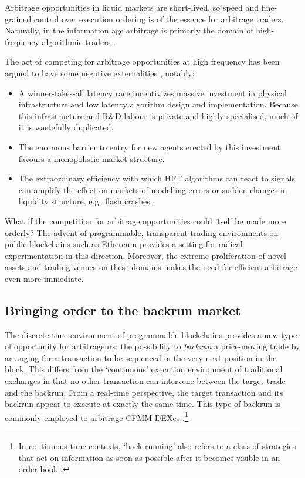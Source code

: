 Arbitrage opportunities in liquid markets are short-lived, so speed and fine-grained control over execution ordering is of the essence for arbitrage traders.
%
Naturally, in the information age arbitrage is primarly the domain of high-frequency algorithmic traders \cite[Part II]{yadav2015algorithmic}.

The act of competing for arbitrage opportunities at high frequency has been argued to have some negative externalities \cite{yadav2015algorithmic,budish2015high,daian2020flash}, notably:
\begin{itemize}
  \item 
    A winner-takes-all latency race incentivizes massive investment in physical infrastructure and low latency algorithm design and implementation.
    Because this infrastructure and R\&D labour is private and highly specialised, much of it is wastefully duplicated.
    
  \item 
    The enormous barrier to entry for new agents erected by this investment favours a monopolistic market structure.

  \item
    The extraordinary efficiency with which HFT algorithms can react to signals can amplify the effect on markets of modelling errors or sudden changes in liquidity structure, e.g.~flash crashes \cite[1628]{yadav2015algorithmic}.

  \end{itemize}

What if the competition for arbitrage opportunities could itself be made more orderly?
%
The advent of programmable, transparent trading environments on public blockchains such as Ethereum provides a setting for radical experimentation in this direction.
%
Moreover, the extreme proliferation of novel assets and trading venues on these domains makes the need for efficient arbitrage even more immediate.




\subsection{Bringing order to the backrun market}

%
The discrete time environment of programmable blockchains provides a new type of opportunity for arbitrageurs: the possibility to \emph{backrun} a price-moving trade by arranging for a transaction to be sequenced in the very next position in the block.
%
This differs from the `continuous' execution environment of traditional exchanges in that no other transaction can intervene between the target trade and the backrun.
%
From a real-time perspective, the target transaction and its backrun appear to execute at exactly the same time. 
%
This type of backrun is commonly employed to arbitrage CFMM DEXes \cite{wang2022cyclic}.\footnote{In continuous time contexts, `back-running' also refers to a class of strategies that act on information as soon as possible after it becomes visible in an order book \cite{yang2020back}.}

